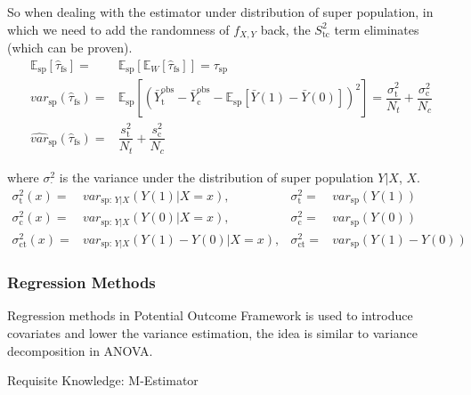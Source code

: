 \begin{itemize}[topsep=2pt,itemsep=0pt]
    So when dealing with the estimator under distribution of super population, in which we need to add the randomness of $ f_{X,Y} $ back, the $ S^2_\mathrm{tc}  $ term eliminates (which can be proven).
    \begin{align}
        \mathbb{E}_\mathrm{sp} \left[ \hat{\tau}_\mathrm{fs}  \right] = & \mathbb{E}_\mathrm{sp} \left[ \mathbb{E}_W \left[ \hat{\tau}_\mathrm{fs}  \right] \right] = \tau_\mathrm{sp}  \\
        var_\mathrm{sp} (\hat{\tau}_\mathrm{fs} )=&\mathbb{E}_\mathrm{sp} \left[( \bar{Y}_\mathrm{t} ^\mathrm{obs}-\bar{Y}_\mathrm{c}^\mathrm{obs}-\mathbb{E}_\mathrm{sp} \left[ \bar{Y}(1)-\bar{Y}(0) \right]    )^2 \right] = \dfrac{\sigma _\mathrm{t}^2 }{N_t}+\dfrac{\sigma _\mathrm{c}^2 }{N_c}\\
        \hat{var}_\mathrm{sp}(\hat{\tau}_\mathrm{fs} )=&\dfrac{s_\mathrm{t}^2 }{N_t}+\dfrac{s_\mathrm{c}^2 }{N_c} 
    \end{align}

    where $ \sigma ^2_\cdot $ is the variance under the distribution of super population $ Y|X $, $ X $.
    \begin{align}
         \sigma _\mathrm{t}^2(x)=&var_{\mathrm{sp}:\,Y|X}\left(Y(1)|X=x\right) ,& \sigma _\mathrm{t}^2=&var_\mathrm{sp}\left(Y(1)\right)\\
         \sigma _\mathrm{c}^2(x)=&var_{\mathrm{sp}:\,Y|X}\left(Y(0)|X=x\right) ,& \sigma _\mathrm{c}^2=&var_\mathrm{sp}\left(Y(0)\right)\\
         \sigma _\mathrm{ct}^2(x)=&var_{\mathrm{sp}:\,Y|X}\left(Y(1)-Y(0)|X=x\right) ,& \sigma _\mathrm{ct}^2=&var_\mathrm{sp}\left(Y(1)-Y(0)\right)
    \end{align}
    
    

    
\end{itemize}


\subsubsection{Regression Methods}

Regression methods in Potential Outcome Framework is used to introduce covariates and lower the variance estimation, the idea is similar to variance decomposition in ANOVA.

\begin{point}
    Requisite Knowledge: M-Estimator
\end{point}

